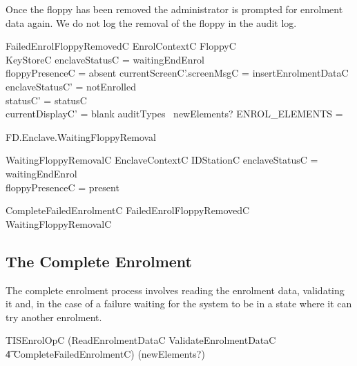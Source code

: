 Once the floppy has been removed the administrator is prompted for
enrolment data again. We do not log the removal of the floppy in the
audit log.

\begin{schema}{FailedEnrolFloppyRemovedC}
        EnrolContextC
\also
        \Xi FloppyC
\\      \Xi KeyStoreC
\where
        enclaveStatusC = waitingEndEnrol
\\      floppyPresenceC = absent
\also
        currentScreenC'.screenMsgC = insertEnrolmentDataC
\also
        enclaveStatusC' = notEnrolled
\\      statusC' = statusC
\\      currentDisplayC' = blank
\also
        auditTypes~ newElements? \cap ENROL\_ELEMENTS = \emptyset
\end{schema}

\begin{traceunit}{FD.Enclave.WaitingFloppyRemoval}
\end{traceunit}

\begin{schema}{WaitingFloppyRemovalC}
        EnclaveContextC
\also
        \Xi IDStationC
\where
        enclaveStatusC = waitingEndEnrol
\\      floppyPresenceC = present
\end{schema}

\begin{zed}
        CompleteFailedEnrolmentC  FailedEnrolFloppyRemovedC 
         \lor WaitingFloppyRemovalC
\end{zed}

\subsection{The Complete Enrolment}

The complete enrolment process involves reading the enrolment data,
validating it and, in the case of a failure waiting for the system to
be in a state where it can try another enrolment.

\begin{zed}
        TISEnrolOpC  (ReadEnrolmentDataC \lor
ValidateEnrolmentDataC 
\\      \t4 \lor CompleteFailedEnrolmentC) \hide (newElements?)
\end{zed}

